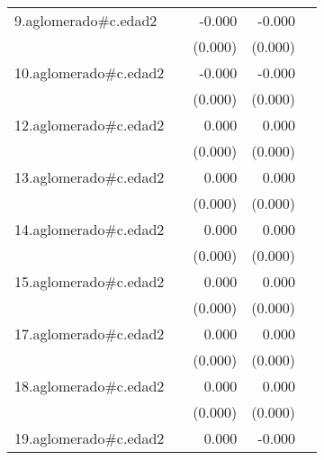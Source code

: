 {\begin{longtable}{l*{4}{D{.}{.}{-1}}}
\addlinespace
9.aglomerado#c.edad2&                     &      -0.000         &      -0.000\sym{***}&                     \\
            &                     &     (0.000)         &     (0.000)         &                     \\
\addlinespace
10.aglomerado#c.edad2&                     &      -0.000         &      -0.000         &                     \\
            &                     &     (0.000)         &     (0.000)         &                     \\
\addlinespace
12.aglomerado#c.edad2&                     &       0.000\sym{*}  &       0.000         &                     \\
            &                     &     (0.000)         &     (0.000)         &                     \\
\addlinespace
13.aglomerado#c.edad2&                     &       0.000         &       0.000         &                     \\
            &                     &     (0.000)         &     (0.000)         &                     \\
\addlinespace
14.aglomerado#c.edad2&                     &       0.000         &       0.000         &                     \\
            &                     &     (0.000)         &     (0.000)         &                     \\
\addlinespace
15.aglomerado#c.edad2&                     &       0.000         &       0.000         &                     \\
            &                     &     (0.000)         &     (0.000)         &                     \\
\addlinespace
17.aglomerado#c.edad2&                     &       0.000\sym{*}  &       0.000         &                     \\
            &                     &     (0.000)         &     (0.000)         &                     \\
\addlinespace
18.aglomerado#c.edad2&                     &       0.000         &       0.000         &                     \\
            &                     &     (0.000)         &     (0.000)         &                     \\
\addlinespace
19.aglomerado#c.edad2&                     &       0.000         &      -0.000         &                     \\

\end{longtable}}
